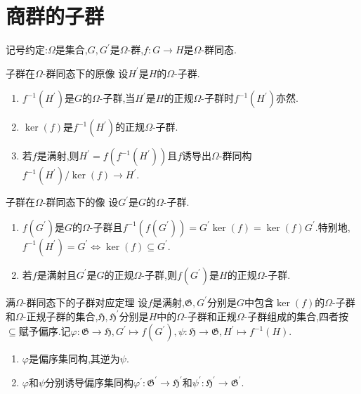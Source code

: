 \section{商群的子群}

记号约定:$\Omega$是集合,$G,G^{\prime}$是$\Omega$-群,$f:G\to H$是$\Omega$-群同态.

\begin{proposition}{子群在$\Omega$-群同态下的原像}{}
	设$H^{\prime}$是$H$的$\Omega$-子群.
	\begin{enumerate}
		\item $f^{-1}\left(H^{\prime}\right)$是$G$的$\Omega$-子群,当$H^{\prime}$是$H$的正规$\Omega$-子群时$f^{-1}\left(H^{\prime}\right)$亦然.
		\item $\ker\left(f\right)$是$f^{-1}\left(H^{\prime}\right)$的正规$\Omega$-子群.
		\item 若$f$是满射,则$H^{\prime}=f\left(f^{-1}\left(H^{\prime}\right)\right)$且$f$诱导出$\Omega$-群同构$f^{-1}\left(H^{\prime}\right)/\ker\left(f\right)\to H^{\prime}$.
	\end{enumerate}
\end{proposition}

\begin{proposition}{子群在$\Omega$-群同态下的像}{}
	设$G^{\prime}$是$G$的$\Omega$-子群.
	\begin{enumerate}
		\item $f\left(G^{\prime}\right)$是$G$的$\Omega$-子群且$f^{-1}\left(f\left(G^{\prime}\right)\right)=G^{\prime}\ker\left(f\right)=\ker\left(f\right)G^{\prime}$.特别地,$f^{-1}\left(H^{\prime}\right)=G^{\prime}\iff\ker\left(f\right)\subseteq G^{\prime}$.
		\item 若$f$是满射且$G^{\prime}$是$G$的正规$\Omega$-子群,则$f\left(G^{\prime}\right)$是$H$的正规$\Omega$-子群.
	\end{enumerate}
\end{proposition}

\begin{corollary}{满$\Omega$-群同态下的子群对应定理}{}
	设$f$是满射,$\mathfrak{G},G^{\prime}$分别是$G$中包含$\ker\left(f\right)$的$\Omega$-子群和$\Omega$-正规子群的集合,$\mathfrak{H},\mathfrak{H}^{\prime}$分别是$H$中的$\Omega$-子群和正规$\Omega$-子群组成的集合,四者按$\subseteq$赋予偏序.记$\varphi:\mathfrak{G}\to\mathfrak{H},G^{\prime}\mapsto f\left(G^{\prime}\right),\psi:\mathfrak{H}\to\mathfrak{G},H^{\prime}\mapsto f^{-1}\left(H\right)$.
	\begin{enumerate}
		\item $\varphi$是偏序集同构,其逆为$\psi$.
		\item $\varphi$和$\psi$分别诱导偏序集同构$\varphi^{\prime}:\mathfrak{G}^{\prime}\to\mathfrak{H}^{\prime}$和$\psi^{\prime}:\mathfrak{H}^{\prime}\to\mathfrak{G}^{\prime}$.
	\end{enumerate}
\end{corollary}


